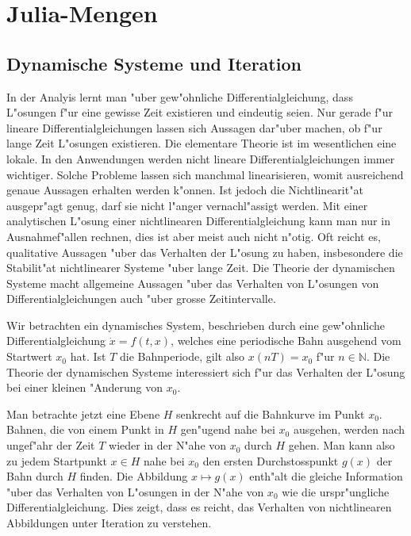 \chapter{Julia-Mengen}
\begin{refsection}

\section{Dynamische Systeme und Iteration}
In der Analyis lernt man "uber 
gew"ohnliche Differentialgleichung, dass L"osungen f"ur eine gewisse
Zeit existieren und eindeutig seien.
Nur gerade f"ur lineare Differentialgleichungen lassen sich Aussagen 
dar"uber machen, ob f"ur lange Zeit L"osungen existieren.
Die elementare Theorie ist im wesentlichen eine lokale.
In den Anwendungen werden nicht lineare Differentialgleichungen immer
wichtiger.
Solche Probleme lassen sich manchmal linearisieren, womit ausreichend
genaue Aussagen erhalten werden k"onnen.
Ist jedoch die Nichtlinearit"at ausgepr"agt genug, darf sie nicht l"anger
vernachl"assigt werden.
Mit einer analytischen L"osung einer nichtlinearen Differentialgleichung
kann man nur in Ausnahmef"allen rechnen, dies ist aber meist auch nicht
n"otig. Oft reicht es, qualitative Aussagen "uber das Verhalten der
L"osung zu haben,
insbesondere die Stabilit"at nichtlinearer Systeme "uber lange Zeit.
Die Theorie der dynamischen Systeme macht allgemeine Aussagen "uber das
Verhalten von L"osungen von Differentialgleichungen auch "uber grosse
Zeitintervalle.

Wir betrachten ein dynamisches System, beschrieben durch eine
gew"ohnliche Differentialgleichung $\dot x= f(t,x)$, welches eine
periodische Bahn ausgehend vom Startwert $x_0$ hat.
Ist $T$ die Bahnperiode, gilt also
$x(nT)=x_0$ f"ur $n\in\mathbb N$.
Die Theorie der dynamischen Systeme interessiert sich f"ur das Verhalten
der L"osung bei einer kleinen "Anderung von $x_0$.

Man betrachte jetzt eine Ebene $H$ senkrecht auf die Bahnkurve im Punkt $x_0$.
Bahnen, die von einem Punkt in $H$ gen"ugend nahe bei $x_0$ ausgehen, werden
nach ungef"ahr der Zeit $T$ wieder in der N"ahe von $x_0$ durch $H$ gehen.
Man kann also zu jedem Startpunkt $x\in H$ nahe bei $x_0$ den ersten
Durchstosspunkt $g(x)$ der Bahn durch $H$ finden.
Die Abbildung $x\mapsto g(x)$ enth"alt die gleiche Information "uber das
Verhalten von L"osungen in der N"ahe von $x_0$ wie die urspr"ungliche
Differentialgleichung.
Dies zeigt, dass es reicht, das Verhalten von nichtlinearen Abbildungen
unter Iteration zu verstehen.


\end{refsection}
